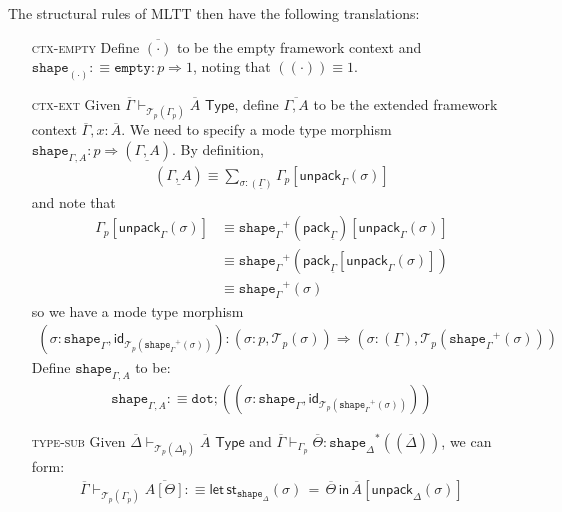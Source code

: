 \documentclass[10pt]{article}
\theoremstyle{definition}
\newcommand{\yields}{\vdash}
\newcommand{\tcell}{\Rightarrow}
\newcommand{\TYPE}{\,\,\mathsf{Type}}
\newcommand{\sigmacl}[3]{\ensuremath{(#1{:}#2,#3)}}
\newcommand{\id}{\mathsf{id}}
\newcommand\St[2]{\ensuremath{{#1}^*(#2)}}
\newcommand\StI[2]{\ensuremath{\mathsf{st}_{#1}(#2)}}
\newcommand\StE[4]{\ensuremath{\mathsf{let} \, \StI{#1}{#3} \, = \, {#2} \, \mathsf{in} \, #4}}
\newcommand\TrPlus[2]{\ensuremath{{#1}^+(#2)}}
\newcommand\El[2]{\mathcal{T}_{#1}(#2)}
\newcommand\ctxtuple[1]{(#1)}
\newcommand\pack[1]{\ensuremath{\mathsf{pack}_{#1}}}
\newcommand\unpack[2]{\ensuremath{\mathsf{unpack}_{#1}(#2)}}
\newcommand{\modeof}[1]{{#1}_p}
\newcommand{\tdot}{\ensuremath{\mathtt{dot}}}
\newcommand{\tempty}{\ensuremath{\mathtt{empty}}}
\newcommand{\tshape}[1]{\ensuremath{\mathtt{shape}_{#1}}}
\newcommand{\upstairs}[1]{\overline{#1}}
\newcommand{\downstairs}[1]{\underline{#1}}
\begin{document}
The structural rules of MLTT then have the following translations:
\begin{enumerate}
\item[\textsc{ctx-empty}] Define $\upstairs{(\cdot)}$ to be the empty framework context and $\tshape{(\cdot)} :\equiv \tempty : p \tcell 1$, noting that $\ctxtuple{(\cdot)} \equiv 1$.

\item[\textsc{ctx-ext}] Given $\upstairs{\Gamma}
  \yields_{\El{p}{\modeof{\Gamma}}} \upstairs{A} \TYPE$, define $\upstairs{\Gamma, A}$ to be the extended framework context $\upstairs{\Gamma}, x : \upstairs{A}$. We need to specify a mode type morphism $\tshape{\Gamma, A} : p \tcell \ctxtuple{\downstairs{\Gamma, A}}$. 
  By definition,
  \begin{align*}
    \ctxtuple{\downstairs{\Gamma, A}} \equiv \sum_{\sigma : \ctxtuple{\downstairs{\Gamma}}} \modeof{\Gamma}[\unpack{\Gamma}{\sigma}]
  \end{align*}
  and note that 
  \begin{align*}
  \modeof{\Gamma}[\unpack{\Gamma}{\sigma}]
  &\equiv \TrPlus{\tshape{\Gamma}}{\pack{\downstairs{\Gamma}}}[\unpack{\Gamma}{\sigma}] \\
  &\equiv \TrPlus{\tshape{\Gamma}}{\pack{\downstairs{\Gamma}}[\unpack{\Gamma}{\sigma}]} \\
  &\equiv \TrPlus{\tshape{\Gamma}}{\sigma}
  \end{align*}
  so we have a mode type morphism
  \begin{align*}
  \sigmacl{\sigma}{\tshape{\Gamma}}{\id_{\El{p}{\TrPlus{\tshape{\Gamma}}{\sigma}}}} : \sigmacl{\sigma}{p}{\El{p}{\sigma}} \tcell \sigmacl{\sigma}{\ctxtuple{\downstairs{\Gamma}}}{\El{p}{\TrPlus{\tshape{\Gamma}}{\sigma}}}
  \end{align*}
  Define $\tshape{\Gamma, A}$ to be:
  \begin{align*}
  \tshape{\Gamma, A} :\equiv \tdot ; (\sigmacl{\sigma}{\tshape{\Gamma}}{\id_{\El{p}{\TrPlus{\tshape{\Gamma}}{\sigma}}}})
  \end{align*}
  
\item[\textsc{type-sub}] Given $\upstairs{\Delta} \yields_{\El{p}{\modeof{\Delta}}} \upstairs{A} \TYPE$ and $\upstairs{\Gamma} \yields_{\modeof{\Gamma}} \upstairs{\Theta} : \St{\tshape{\Delta}}{\ctxtuple{\upstairs{\Delta}}}$, we can form:
\begin{align*}
\upstairs{\Gamma} \yields_{\El{p}{\modeof{\Gamma}}} \upstairs{A[\Theta]} :\equiv \StE{\tshape{\Delta}}{\upstairs{\Theta}}{\sigma}{\upstairs{A}[\unpack{\Delta}{\sigma}]}
\end{align*}


\end{enumerate}
\end{document}
